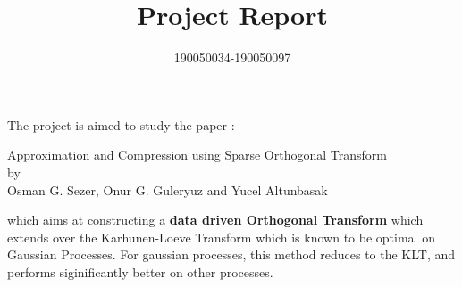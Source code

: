 \documentclass{article}
\title{Project Report}
\author{190050034-190050097}
\theoremstyle{remark}
\begin{document}
\hypersetup{pageanchor=false}
\maketitle
{}

The project is aimed to study the paper :
\begin{center}
Approximation and Compression using Sparse Orthogonal Transform\\
by\\
Osman G. Sezer, Onur G. Guleryuz and Yucel Altunbasak
\end{center}
which aims at constructing a \textbf{data driven Orthogonal Transform} which extends over the Karhunen-Loeve Transform which is known to be optimal on Gaussian Processes. For gaussian processes, this method reduces to the KLT, and performs siginificantly better on other processes.
\end{document}
